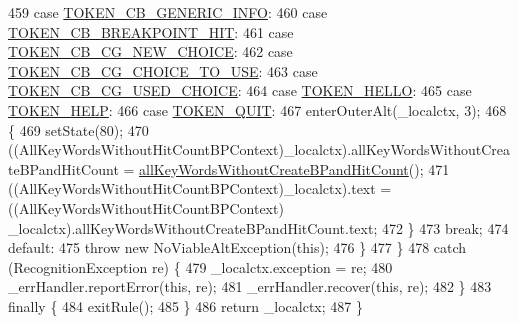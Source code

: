 \begin{DoxyCode}
459       \textcolor{keywordflow}{case} \hyperlink{classgov_1_1nasa_1_1jpf_1_1inspector_1_1client_1_1parser_1_1_console_grammar_parser_ac2864ce68a47e8fefc6f2e66e1f0af5e}{TOKEN\_CB\_GENERIC\_INFO}:
460       \textcolor{keywordflow}{case} \hyperlink{classgov_1_1nasa_1_1jpf_1_1inspector_1_1client_1_1parser_1_1_console_grammar_parser_a7e8632d59cca2eb259cbb68a977634ed}{TOKEN\_CB\_BREAKPOINT\_HIT}:
461       \textcolor{keywordflow}{case} \hyperlink{classgov_1_1nasa_1_1jpf_1_1inspector_1_1client_1_1parser_1_1_console_grammar_parser_a94b196d0e6cf1228268a2e715e79bad7}{TOKEN\_CB\_CG\_NEW\_CHOICE}:
462       \textcolor{keywordflow}{case} \hyperlink{classgov_1_1nasa_1_1jpf_1_1inspector_1_1client_1_1parser_1_1_console_grammar_parser_ac1184502e08afcb6108e6a6e94b39ae6}{TOKEN\_CB\_CG\_CHOICE\_TO\_USE}:
463       \textcolor{keywordflow}{case} \hyperlink{classgov_1_1nasa_1_1jpf_1_1inspector_1_1client_1_1parser_1_1_console_grammar_parser_a8edea4613d4c563c2f219e1d695e32f6}{TOKEN\_CB\_CG\_USED\_CHOICE}:
464       \textcolor{keywordflow}{case} \hyperlink{classgov_1_1nasa_1_1jpf_1_1inspector_1_1client_1_1parser_1_1_console_grammar_parser_a02654226879b17f8ee3fc4508bacb0e0}{TOKEN\_HELLO}:
465       \textcolor{keywordflow}{case} \hyperlink{classgov_1_1nasa_1_1jpf_1_1inspector_1_1client_1_1parser_1_1_console_grammar_parser_a8acc93fe5d687353ad83d5b6b7af39dd}{TOKEN\_HELP}:
466       \textcolor{keywordflow}{case} \hyperlink{classgov_1_1nasa_1_1jpf_1_1inspector_1_1client_1_1parser_1_1_console_grammar_parser_a50c90ab80070963c445793482e90700e}{TOKEN\_QUIT}:
467         enterOuterAlt(\_localctx, 3);
468         \{
469         setState(80);
470         ((AllKeyWordsWithoutHitCountBPContext)\_localctx).allKeyWordsWithoutCreateBPandHitCount = 
      \hyperlink{classgov_1_1nasa_1_1jpf_1_1inspector_1_1client_1_1parser_1_1_console_grammar_parser_aff31036dcee67dbba83def31e4761e4e}{allKeyWordsWithoutCreateBPandHitCount}();
471          ((AllKeyWordsWithoutHitCountBPContext)\_localctx).text =  ((AllKeyWordsWithoutHitCountBPContext)
      \_localctx).allKeyWordsWithoutCreateBPandHitCount.text; 
472         \}
473         \textcolor{keywordflow}{break};
474       \textcolor{keywordflow}{default}:
475         \textcolor{keywordflow}{throw} \textcolor{keyword}{new} NoViableAltException(\textcolor{keyword}{this});
476       \}
477     \}
478     \textcolor{keywordflow}{catch} (RecognitionException re) \{
479       \_localctx.exception = re;
480       \_errHandler.reportError(\textcolor{keyword}{this}, re);
481       \_errHandler.recover(\textcolor{keyword}{this}, re);
482     \}
483     \textcolor{keywordflow}{finally} \{
484       exitRule();
485     \}
486     \textcolor{keywordflow}{return} \_localctx;
487   \}
\end{DoxyCode}
